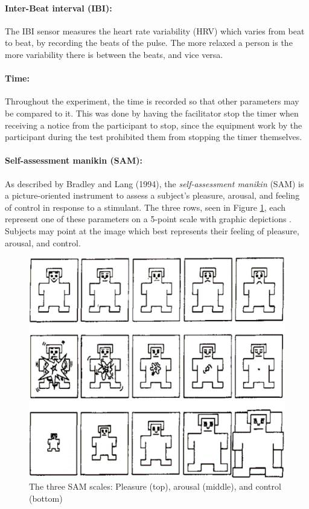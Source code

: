 \paragraph{Inter-Beat interval (IBI):} The IBI sensor measures the heart rate variability (HRV) which varies from beat to beat, by recording the beats of the pulse. The more relaxed a person is the more variability there is between the beats, and vice versa. 
\paragraph{Time:} Throughout the experiment, the time is recorded so that other parameters may be compared to it. This was done by having the facilitator stop the timer when receiving a notice from the participant to stop, since the equipment work by the participant during the test prohibited them from stopping the timer themselves.
\paragraph{Self-assessment manikin (SAM):} As described by Bradley and Lang (1994), the \textit{self-assessment manikin} (SAM) is a picture-oriented instrument to assess a subject’s pleasure, arousal, and feeling of control in response to a stimulant. The three rows, seen in Figure \ref{fig:SAM}, each represent one of these parameters on a 5-point scale with graphic depictions \cite{Bradley1994}. Subjects may point at the image which best represents their feeling of pleasure, arousal, and control.

\begin{figure}[h!]
    \centering
    \includegraphics[width=\textwidth]{figures/SAM.png}
    \caption{The three SAM scales: Pleasure (top), arousal (middle), and control (bottom) \cite{Bradley1994}}\label{fig:SAM}
\end{figure}

